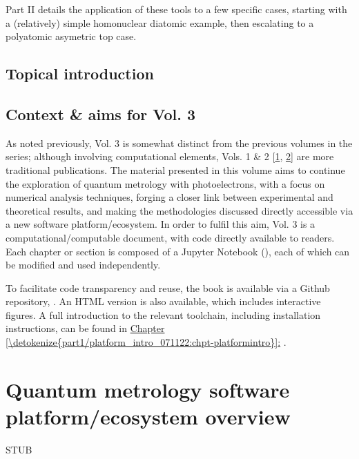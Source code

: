 \documentclass[letterpaper,10pt,english]{jupyterBook}
\begin{document}
\sphinxAtStartPar
Part II details the application of these tools to a few specific cases, starting with a (relatively) simple homonuclear diatomic example, then escalating to a polyatomic asymetric top case.


\section{Topical introduction}
\label{\detokenize{part1/main_intro_051122:topical-introduction}}

\section{Context \& aims for Vol. 3}
\label{\detokenize{part1/main_intro_051122:context-aims-for-vol-3}}
\sphinxAtStartPar
As noted previously, Vol. 3 is somewhat distinct from the previous volumes in the series; although involving computational elements, Vols. 1 \& 2 {[}\hyperlink{cite.backmatter/bibliography:id52}{1}, \hyperlink{cite.backmatter/bibliography:id53}{2}{]} are more traditional publications. The material presented in this volume aims to continue the exploration of quantum metrology with photoelectrons, with a focus on numerical analysis techniques, forging a closer link between experimental and theoretical results, and making the methodologies discussed directly accessible via a new software platform/ecosystem. In order to fulfil this aim, Vol. 3 is a computational/computable document, with code directly available to readers. Each chapter or section is composed of a Jupyter Notebook (), each of which can be modified and used independently.

\sphinxAtStartPar
To facilitate code transparency and reuse, the book is available via a Github repository, . An HTML version is also available, which includes interactive figures. A full introduction to the relevant tool\sphinxhyphen{}chain, including installation instructions, can be found in \hyperref[\detokenize{part1/platform_intro_071122:chpt-platformintro}]{Chapter \ref{\detokenize{part1/platform_intro_071122:chpt-platformintro}}:} {\hyperref[\detokenize{part1/platform_intro_071122:chpt-platformintro}]{}}.

\sphinxstepscope


\chapter{Quantum metrology software platform/ecosystem overview}
\label{\detokenize{part1/platform_intro_071122:quantum-metrology-software-platform-ecosystem-overview}}\label{\detokenize{part1/platform_intro_071122:chpt-platformintro}}\label{\detokenize{part1/platform_intro_071122::doc}}
\sphinxAtStartPar
STUB
\end{document}
